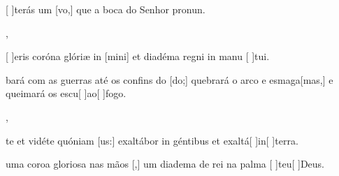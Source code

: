 {    {\item {}[ ]{te}rás um [vo,] que a boca do Senhor pronun.},
  {\item {}[ ]{e}ris coróna glóriæ in [mini] et diadéma regni in manu [ ]{tu}i.}%
    {\item {}bará com as guerras até os confins do [do;] quebrará o arco e esmaga[mas,] e queimará os escu[ ]{ao}[ ]{fo}go.},
  {\item {}te et vidéte quóniam [us:] exaltábor in géntibus et exaltá[ ]{in}[ ]{ter}ra.}%
    {\item {} uma coroa gloriosa nas mãos [,] um diadema de rei na palma [ ]{teu}[ ]{Deus}.}
}